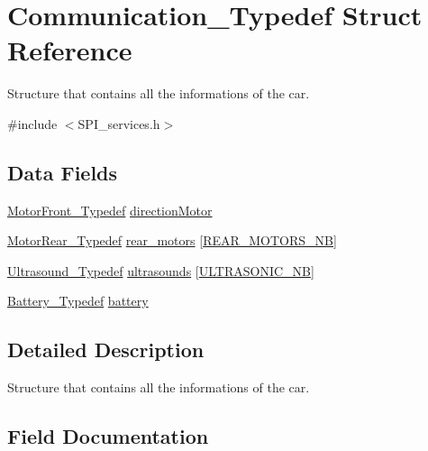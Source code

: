\hypertarget{struct_communication___typedef}{}\section{Communication\+\_\+\+Typedef Struct Reference}
\label{struct_communication___typedef}


Structure that contains all the informations of the car.  




{\ttfamily \#include $<$S\+P\+I\+\_\+services.\+h$>$}

\subsection*{Data Fields}
\begin{DoxyCompactItemize}
\item 
\hyperlink{struct_motor_front___typedef}{Motor\+Front\+\_\+\+Typedef} \hyperlink{struct_communication___typedef_a3a8290e3b46dab6047435b592b81efdc}{direction\+Motor}
\item 
\hyperlink{struct_motor_rear___typedef}{Motor\+Rear\+\_\+\+Typedef} \hyperlink{struct_communication___typedef_a718b0adfdc43ccf0d67399e1583ac599}{rear\+\_\+motors} \mbox{[}\hyperlink{motor__common_8h_adca07b02a9d917897a9809b7b19a2f79}{R\+E\+A\+R\+\_\+\+M\+O\+T\+O\+R\+S\+\_\+\+NB}\mbox{]}
\item 
\hyperlink{struct_ultrasound___typedef}{Ultrasound\+\_\+\+Typedef} \hyperlink{struct_communication___typedef_a30835d9cdfc16faa82377c90fe401538}{ultrasounds} \mbox{[}\hyperlink{sensors__common_8h_a26f5abbcd6c4905330b730b809794176}{U\+L\+T\+R\+A\+S\+O\+N\+I\+C\+\_\+\+NB}\mbox{]}
\item 
\hyperlink{struct_battery___typedef}{Battery\+\_\+\+Typedef} \hyperlink{struct_communication___typedef_ae3d4b0bc189b56df3a0e34afd8fe98b2}{battery}
\end{DoxyCompactItemize}


\subsection{Detailed Description}
Structure that contains all the informations of the car. 

\subsection{Field Documentation}
\mbox{\label{struct_communication___typedef_ae3d4b0bc189b56df3a0e34afd8fe98b2}} 
